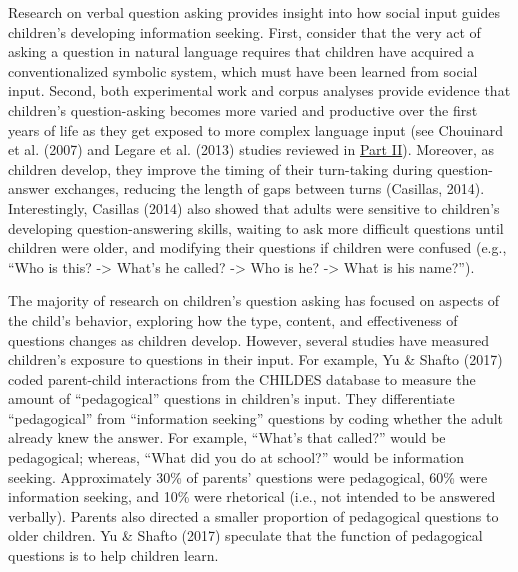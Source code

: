 \documentclass[oneside]{report}
\begin{document}
Research on verbal question asking provides insight into how social
input guides children's developing information seeking. First, consider
that the very act of asking a question in natural language requires that
children have acquired a conventionalized symbolic system, which must
have been learned from social input. Second, both experimental work and
corpus analyses provide evidence that children's question-asking becomes
more varied and productive over the first years of life as they get
exposed to more complex language input (see Chouinard et al. (2007) and
Legare et al. (2013) studies reviewed in \protect\hyperlink{p2}{Part
II}). Moreover, as children develop, they improve the timing of their
turn-taking during question-answer exchanges, reducing the length of
gaps between turns (Casillas, 2014). Interestingly, Casillas (2014) also
showed that adults were sensitive to children's developing
question-answering skills, waiting to ask more difficult questions until
children were older, and modifying their questions if children were
confused (e.g., ``Who is this? -\textgreater{} What's he called?
-\textgreater{} Who is he? -\textgreater{} What is his name?'').

The majority of research on children's question asking has focused on
aspects of the child's behavior, exploring how the type, content, and
effectiveness of questions changes as children develop. However, several
studies have measured children's exposure to questions in their input.
For example, Yu \& Shafto (2017) coded parent-child interactions from
the CHILDES database to measure the amount of ``pedagogical'' questions
in children's input. They differentiate ``pedagogical'' from
``information seeking'' questions by coding whether the adult already
knew the answer. For example, ``What's that called?'' would be
pedagogical; whereas, ``What did you do at school?'' would be
information seeking. Approximately 30\% of parents' questions were
pedagogical, 60\% were information seeking, and 10\% were rhetorical
(i.e., not intended to be answered verbally). Parents also directed a
smaller proportion of pedagogical questions to older children. Yu \&
Shafto (2017) speculate that the function of pedagogical questions is to
help children learn.
\end{document}
